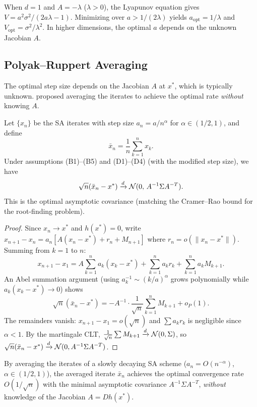 \documentclass[11pt,a4paper]{article}
\begin{document}
\begin{remark}
\label{rem:optimal-step}
When $d = 1$ and $A = -\lambda$ ($\lambda > 0$), the Lyapunov
equation gives $V = a^2\sigma^2/(2a\lambda - 1)$. Minimizing over
$a > 1/(2\lambda)$ yields $a_{\mathrm{opt}} = 1/\lambda$ and
$V_{\mathrm{opt}} = \sigma^2/\lambda^2$. In higher dimensions,
the optimal $a$ depends on the unknown Jacobian $A$.
\end{remark}

\subsection{Polyak--Ruppert Averaging}

The optimal step size depends on the Jacobian $A$ at $x^*$, which
is typically unknown. \citet{polyak1992} proposed averaging the
iterates to achieve the optimal rate \emph{without} knowing $A$.

\begin{theorem}
\label{thm:polyak-ruppert}
Let $\{x_n\}$ be the SA iterates with step size
$a_n = a/n^\alpha$ for $\alpha \in (1/2, 1)$, and define
\[
  \bar{x}_n = \frac{1}{n}\sum_{k=1}^{n} x_k.
\]
Under assumptions (B1)--(B5) and (D1)--(D4) (with the modified step
size), we have
\[
  \sqrt{n}(\bar{x}_n - x^*) \xrightarrow{d}
    \mathcal{N}(0,\, A^{-1}\Sigma A^{-T}).
\]
This is the optimal asymptotic covariance (matching the
Cramer--Rao bound for the root-finding problem).
\end{theorem}

\begin{proof}
Since $x_n \to x^*$ and $h(x^*) = 0$, write
$x_{n+1} - x_n = a_n[A(x_n - x^*) + r_n + M_{n+1}]$ where
$r_n = o(\|x_n - x^*\|)$. Summing from $k=1$ to $n$:
\[
  x_{n+1} - x_1 = A\sum_{k=1}^n a_k(x_k - x^*)
    + \sum_{k=1}^n a_k r_k + \sum_{k=1}^n a_k M_{k+1}.
\]
An Abel summation argument (using $a_k^{-1} \sim (k/a)^\alpha$
grows polynomially while $a_k(x_k-x^*) \to 0$) shows
\[
  \sqrt{n}(\bar{x}_n - x^*)
    = -A^{-1}\cdot\frac{1}{\sqrt{n}}\sum_{k=1}^n M_{k+1} + o_P(1).
\]
The remainders vanish: $x_{n+1} - x_1 = o(\sqrt{n})$ and
$\sum a_k r_k$ is negligible since $\alpha < 1$. By the martingale
CLT, $\frac{1}{\sqrt{n}}\sum M_{k+1} \xrightarrow{d} \mathcal{N}(0,\Sigma)$,
so $\sqrt{n}(\bar{x}_n - x^*) \xrightarrow{d} \mathcal{N}(0, A^{-1}\Sigma A^{-T})$.
\end{proof}

\begin{keyresult}[title={Polyak--Ruppert Averaging}]
By averaging the iterates of a slowly decaying SA scheme
($a_n = O(n^{-\alpha})$, $\alpha \in (1/2,1)$), the averaged
iterate $\bar{x}_n$ achieves the optimal convergence rate
$O(1/\sqrt{n})$ with the minimal asymptotic covariance
$A^{-1}\Sigma A^{-T}$, \emph{without} knowledge of the Jacobian
$A = Dh(x^*)$.
\end{keyresult}
\end{document}
